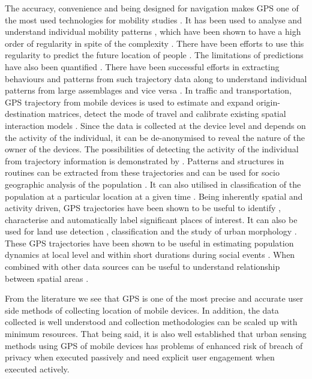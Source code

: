 The accuracy, convenience and being designed for navigation makes GPS one of the most used technologies for mobility studies \cite{gonzalez2008}.
It has been used to analyse and understand individual mobility patterns \citep{neuhaus2009, shin2010}, which have been shown to have a high order of regularity in spite of the complexity \citep{brockmann2006, song2010a}.
There have been efforts to use this regularity to predict the future location of people \citep{monreale2009, calabrese2010}.
The limitations of predictions have also been quantified \citep{song2010}.
There have been successful efforts in extracting behaviours and patterns from such trajectory data \citep{liu2010, cho2011, hoteit2013, pappalardo2013} along to understand individual patterns from large assemblages \citep{giannotti2011, calabrese2013} and vice versa \citep{wirz2012}.
In traffic and transportation, GPS trajectory from mobile devices is used to estimate \citep{calabrese2011} and expand \citep{jing2011} origin-destination matrices, detect the mode of travel \citep{gong2012, rossi2015} and calibrate existing spatial interaction models \citep{yue2012}
.
Since the data is collected at the device level and depends on the activity of the individual, it can be de-anonymised to reveal the nature of the owner of the devices.
The possibilities of detecting the activity of the individual from trajectory information is demonstrated by \citep{liao2006, krumm2007}.
Patterns \citep{jiang2012} and structures in routines \citep{eagle2009} can be extracted from these trajectories and can be used for socio geographic analysis of the population \citep{licoppe2008, chen2018}.
It can also utilised in classification of the population at a particular location at a given time \cite[-1cm]{pappalardo2015}.
Being inherently spatial and activity driven, GPS trajectories have been shown to be useful to identify \citep{bao2012}, characterise \citep{wan2013} and automatically label \citep{do2014} significant places of interest.
It can also be used for land use detection \citep{toole2012, zhang2018}, classification \citep{jiang2015} and the study of urban morphology \citep{kang2012}.
These GPS trajectories have been shown to be useful in estimating population dynamics at local level and within short durations during social events \citep{calabrese2010, kim2014, deville2014}.
When combined with other data sources can be useful to understand relationship between spatial areas \citep{long2015}.

From the literature we see that GPS is one of the most precise and accurate user side methods of collecting location of mobile devices.
In addition, the data collected is well understood and collection methodologies can be scaled up with minimum resources.
That being said, it is also well established that urban sensing methods using GPS of mobile devices has problems of enhanced risk of breach of privacy when executed passively and need explicit user engagement when executed actively.

